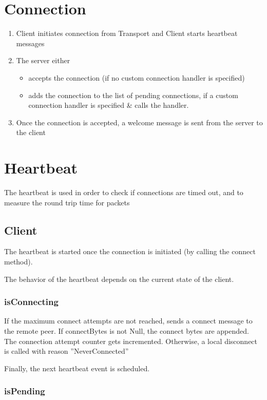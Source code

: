 \section{Connection}

\begin{enumerate}
	\item Client initiates connection from Transport and Client starts heartbeat messages
	\item The server either
	\begin{itemize}
		\item accepts the connection (if no custom connection handler is specified)
		\item adds the connection to the list of pending connections, if a custom connection handler is specified \& calls the handler.
	\end{itemize}
	\item Once the connection is accepted, a welcome message is sent from the server to the client
\end{enumerate}

\section{Heartbeat}

The heartbeat is used in order to check if connections are timed out, and to measure the round trip time for packets

\subsection{Client}

The heartbeat is started once the connection is initiated (by calling the connect method).

The behavior of the heartbeat depends on the current state of the client.

\subsubsection{isConnecting}

If the maximum connect attempts are not reached, sends a connect message to the remote peer. If connectBytes is not Null, the connect bytes are appended. The connection attempt counter gets incremented. Otherwise, a local disconnect is called with reason ''NeverConnected''

Finally, the next heartbeat event is scheduled.

\subsubsection{isPending}

